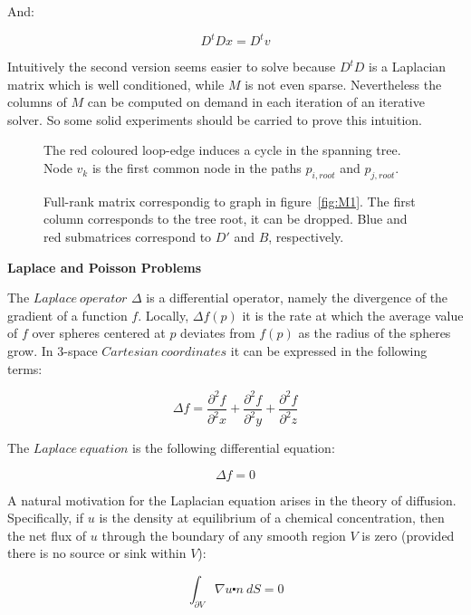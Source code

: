 \documentclass[a4paper,11pt]{article}
\begin{document}
And:

$$D^tDx = D^tv$$

Intuitively the second version seems easier to solve because $D^tD$ is 
a Laplacian matrix which is well conditioned, while $M$ is not even 
sparse. Nevertheless the columns of $M$ can be computed on demand in 
each iteration of an iterative solver. So some solid experiments should 
be carried to prove this intuition.

\newpage

\begin{figure}
\centering

\caption{The red coloured loop-edge induces a cycle in the spanning 
tree. Node $v_k$ is the first common node in the paths $p_{i,root}$ 
and $p_{j,root}$.}
\label{fig:M3}
\end{figure}


\begin{figure}
\centering

\caption{Full-rank matrix correspondig to graph in figure~\ref{fig:M1}. 
The first column corresponds to the tree root, it can be dropped. 
Blue and red submatrices correspond to $D'$ and $B$, 
respectively.}
\label{fig:M4}
\end{figure}

\newpage

\textbf{Laplace and Poisson Problems}

\bigskip

The $Laplace \ operator$ $\Delta$ is a differential operator, namely the divergence 
of the gradient of a function $f$. Locally, $\Delta f(p)$ it is the rate at which the 
average value of $f$ over spheres centered at $p$ deviates from $f(p)$ 
as the radius of the spheres grow. In 3-space $Cartesian \  
coordinates$ it can be expressed in the following terms:

$$\Delta f = \frac{\partial^2 f}{\partial^2 x}+\frac{\partial^2 f}{\partial^2 
y}+\frac{\partial^2 f}{\partial^2 z}$$

\bigskip

The $Laplace \ equation$ is the following differential equation:

$$\Delta f = 0$$

A natural motivation for the Laplacian equation arises in the theory of 
diffusion. Specifically, if $u$ is the density at equilibrium of a 
chemical concentration, then the net flux of $u$ through the boundary 
of any smooth region $V$ is zero (provided there is no source or sink 
within $V$):

$$\int_{\partial V} \nabla u \centerdot n \ dS = 0$$
\end{document}
